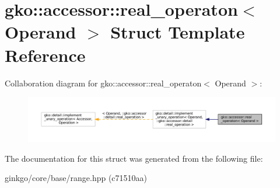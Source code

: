 \hypertarget{structgko_1_1accessor_1_1real__operaton}{}\section{gko\+:\+:accessor\+:\+:real\+\_\+operaton$<$ Operand $>$ Struct Template Reference}
\label{structgko_1_1accessor_1_1real__operaton}


Collaboration diagram for gko\+:\+:accessor\+:\+:real\+\_\+operaton$<$ Operand $>$\+:
\nopagebreak
\begin{figure}[H]
\begin{center}
\leavevmode
\includegraphics[width=350pt]{structgko_1_1accessor_1_1real__operaton__coll__graph}
\end{center}
\end{figure}


The documentation for this struct was generated from the following file\+:\begin{DoxyCompactItemize}
\item 
ginkgo/core/base/range.\+hpp (c71510aa)\end{DoxyCompactItemize}

